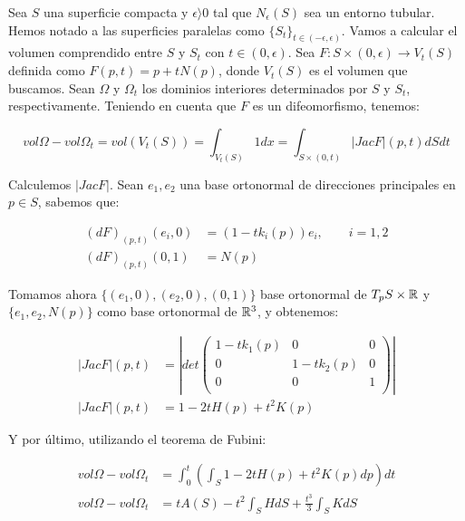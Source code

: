 \begin{remark}
Sea $S$ una superficie compacta y $\epsilon  \rangle  0$ tal que $N_\epsilon(S)$ sea un entorno tubular. Hemos notado a las superficies paralelas como $\{S_t\}_{t \in (-\epsilon, \epsilon)}$. Vamos a calcular el volumen comprendido entre $S$ y $S_t$ con $t\in (0, \epsilon)$. Sea $F: S \times (0, \epsilon) \longrightarrow V_t(S)$ definida como $F(p, t) = p + tN(p)$, donde $V_t(S)$ es el volumen que buscamos. Sean $\Omega$ y $\Omega_t$ los dominios interiores determinados por $S$ y $S_t$, respectivamente. Teniendo en cuenta que $F$ es un difeomorfismo, tenemos:

\begin{equation*}
    vol \Omega - vol \Omega_t = vol (V_t(S)) = \int_{V_t(S)} 1dx = \int_{S \times (0,t)} |JacF|(p,t)dSdt
\end{equation*}

Calculemos $|Jac F|$. Sean ${e_1, e_2}$ una base ortonormal de direcciones principales en $p \in S$, sabemos que:

\begin{align*}
    (dF)_{(p,t)}(e_i,0) &= (1-tk_i(p))e_i, \qquad i = 1,2 \\
    (dF)_{(p,t)}(0,1) &= N(p)
\end{align*}

Tomamos ahora $\{(e_1,0), (e_2,0), (0,1)\}$ base ortonormal de $T_pS \times \mathbb{R}$ y $\{e_1, e_2, N(p)\}$ como base ortonormal de $\mathbb{R}^3$, y obtenemos:

\begin{align*}
    |Jac F|(p,t) &= \left|
  det \left( {\begin{array}{ccc}
   1 - tk_1(p) & 0 & 0 \\
   0 & 1-tk_2(p) & 0 \\
   0 & 0 & 1 \\
  \end{array} } \right) \right| \\
  |Jac F|(p,t) &= 1 - 2tH(p) + t^2K(p)
\end{align*}

Y por último, utilizando el teorema de Fubini:

\begin{align*}
    vol \Omega - vol \Omega_t &= \int_0^t \left( \int_{S} 1-2tH(p)+t^2K(p) dp \right) dt \\
    vol \Omega - vol \Omega_t &= tA(S) - t^2\int_S HdS + \frac{t^3}{3}\int_S KdS
\end{align*}
\end{remark}


